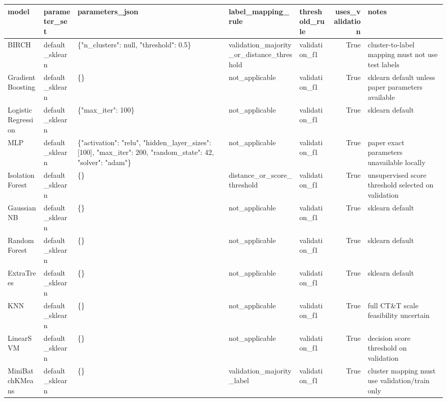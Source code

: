 \begin{tabular}{lllllrl}
\toprule
model & parameter\_set & parameters\_json & label\_mapping\_rule & threshold\_rule & uses\_validation & notes \\
\midrule
BIRCH & default\_sklearn & \{"n\_clusters": null, "threshold": 0.5\} & validation\_majority\_or\_distance\_threshold & validation\_f1 & True & cluster-to-label mapping must not use test labels \\
GradientBoosting & default\_sklearn & \{\} & not\_applicable & validation\_f1 & True & sklearn default unless paper parameters available \\
LogisticRegression & default\_sklearn & \{"max\_iter": 100\} & not\_applicable & validation\_f1 & True & sklearn default \\
MLP & default\_sklearn & \{"activation": "relu", "hidden\_layer\_sizes": [100], "max\_iter": 200, "random\_state": 42, "solver": "adam"\} & not\_applicable & validation\_f1 & True & paper exact parameters unavailable locally \\
IsolationForest & default\_sklearn & \{\} & distance\_or\_score\_threshold & validation\_f1 & True & unsupervised score threshold selected on validation \\
GaussianNB & default\_sklearn & \{\} & not\_applicable & validation\_f1 & True & sklearn default \\
RandomForest & default\_sklearn & \{\} & not\_applicable & validation\_f1 & True & sklearn default \\
ExtraTrees & default\_sklearn & \{\} & not\_applicable & validation\_f1 & True & sklearn default \\
KNN & default\_sklearn & \{\} & not\_applicable & validation\_f1 & True & full CT\&T scale feasibility uncertain \\
LinearSVM & default\_sklearn & \{\} & not\_applicable & validation\_f1 & True & decision score threshold on validation \\
MiniBatchKMeans & default\_sklearn & \{\} & validation\_majority\_label & validation\_f1 & True & cluster mapping must use validation/train only \\
\bottomrule
\end{tabular}
